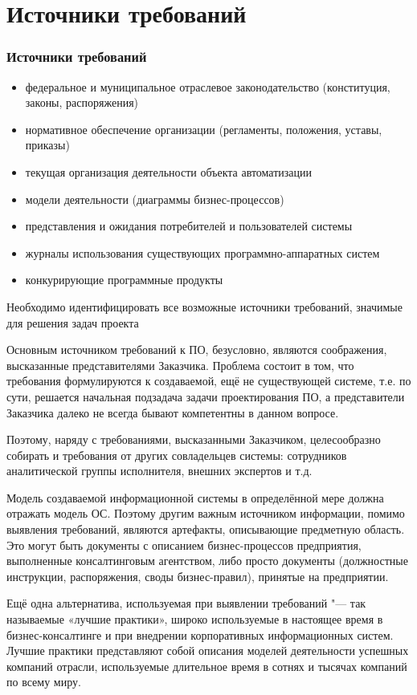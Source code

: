 \documentclass{../industrial-development}
\begin{document}
\section{Источники требований}
\begin{frame} \frametitle{Источники требований}
 \begin{itemize}
\item федеральное и муниципальное отраслевое законодательство (конституция, законы, распоряжения)
\item нормативное обеспечение организации (регламенты, положения, уставы, приказы)
\item текущая организация деятельности объекта автоматизации
\item модели деятельности (диаграммы бизнес-процессов)
\item представления и ожидания потребителей и пользователей системы
\item журналы использования существующих программно-аппаратных систем
\item конкурирующие программные продукты
  \end{itemize}
Необходимо идентифицировать \alert{все возможные источники требований}, значимые для решения задач проекта
\end{frame}

\lecturenotes

Основным источником требований к ПО, безусловно, являются соображения, высказанные представителями Заказчика. Проблема состоит в том, что требования формулируются к создаваемой, ещё не существующей системе, т.е. по сути, решается начальная подзадача задачи проектирования ПО, а представители Заказчика далеко не всегда бывают компетентны в данном вопросе. 

Поэтому, наряду с требованиями, высказанными Заказчиком, целесообразно собирать и требования от других совладельцев системы: сотрудников аналитической группы исполнителя, внешних экспертов и т.д.

Модель создаваемой информационной системы в определённой мере должна отражать модель ОС. Поэтому другим важным источником информации, помимо выявления требований, являются артефакты, описывающие предметную область. Это могут быть документы с описанием бизнес-процессов предприятия, выполненные консалтинговым агентством, либо просто документы (должностные инструкции, распоряжения, своды бизнес-правил), принятые на предприятии.

Ещё одна альтернатива, используемая при выявлении требований "--- так называемые «лучшие практики», широко используемые в настоящее время в бизнес-консалтинге и при внедрении корпоративных информационных систем. Лучшие практики представляют собой описания моделей деятельности успешных компаний отрасли, используемые длительное время в сотнях и тысячах компаний по всему миру.
\end{document}
